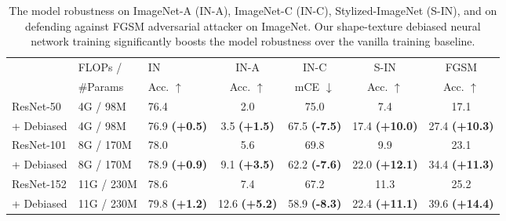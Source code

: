 \documentclass{article} \usepackage{iclr2021_conference,times}
\begin{document}
\begin{table}[t]
\renewcommand\arraystretch{0.8}
\small
\centering
\begin{tabular}{l|HHcccc}
\toprule
& FLOPs / & \scshape{IN} & \scshape{IN-A} & \scshape{IN-C} & \scshape{S-IN} & \scshape{FGSM} \\ 
& \#Params & {\footnotesize Acc. \color{red}$\mathbf{\uparrow}$} & {\footnotesize Acc. \color{red}$\mathbf{\uparrow}$} & {\footnotesize mCE \color{red}$\mathbf{\downarrow}$} & {\footnotesize Acc. \color{red}$\mathbf{\uparrow}$} & {\footnotesize Acc. \color{red}$\mathbf{\uparrow}$} \\
\midrule
ResNet-50     &  4G / 98M &    76.4 & 2.0      &   75.0         &      7.4             &   17.1   \\

+ Debiased       & 4G / 98M &  76.9 {\footnotesize \color{Highlight} \textbf{(+0.5)}} &   3.5 {\footnotesize \color{Highlight} \textbf{(+1.5)}}     &    67.5 {\footnotesize \color{Highlight} \textbf{(-7.5)}}        &       17.4 {\footnotesize \color{Highlight} \textbf{(+10.0)}}            &   27.4 {\footnotesize \color{Highlight} \textbf{(+10.3)}}   \\
\midrule
ResNet-101      & 8G / 170M &   78.0 &    5.6    &       69.8     &           9.9        &   23.1   \\
+ Debiased          &   8G / 170M & 78.9 {\footnotesize \color{Highlight} \textbf{(+0.9)}} &    9.1 {\footnotesize \color{Highlight} \textbf{(+3.5)}}    &       62.2 {\footnotesize \color{Highlight} \textbf{(-7.6)}}     &            22.0 {\footnotesize \color{Highlight} \textbf{(+12.1)}}       &   34.4 {\footnotesize \color{Highlight} \textbf{(+11.3)}}   \\ \midrule
ResNet-152      &  11G / 230M &  78.6 & 7.4        &   67.2         &       11.3            &   25.2   \\
+ Debiased   &  11G / 230M &  79.8 {\footnotesize \color{Highlight} \textbf{(+1.2)}} & 12.6 {\footnotesize \color{Highlight} \textbf{(+5.2)}}        &   58.9 {\footnotesize \color{Highlight} \textbf{(-8.3)}}         &      22.4 {\footnotesize \color{Highlight} \textbf{(+11.1)}}             &   39.6 {\footnotesize \color{Highlight} \textbf{(+14.4)}}   \\
\bottomrule
\end{tabular}
\vspace{-0.9em}
\caption{The model robustness on ImageNet-A (IN-A), ImageNet-C (IN-C), Stylized-ImageNet (S-IN), and on defending against FGSM adversarial attacker on ImageNet. Our shape-texture debiased neural network training significantly boosts the model robustness over the vanilla training baseline.}
\label{tab:imagenet_robustness}
\vspace{-1.6em}
\end{table}
\end{document}
